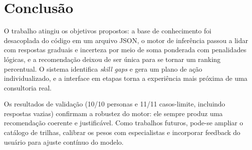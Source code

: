 \documentclass[12pt,a4paper]{article}
\begin{document}
\section{Conclus\~ao}

O trabalho atingiu os objetivos propostos: a base de conhecimento foi
desacoplada do c\'odigo em um arquivo JSON, o motor de infer\^encia passou a lidar
com respostas graduais e incerteza por meio de soma ponderada com penalidades
l\'ogicas, e a recomenda\c{c}\~ao deixou de ser \'unica para se tornar um ranking
percentual. O sistema identifica \textit{skill gaps} e gera um plano de a\c{c}\~ao
individualizado, e a interface em etapas torna a experi\^encia mais pr\'oxima de
uma consultoria real.

Os resultados de valida\c{c}\~ao (10/10 personas e 11/11 casos-limite, incluindo
respostas vazias) confirmam a robustez do motor: ele sempre produz uma
recomenda\c{c}\~ao coerente e justific\'avel. Como trabalhos futuros, pode-se
ampliar o cat\'alogo de trilhas, calibrar os pesos com especialistas e incorporar
feedback do usu\'ario para ajuste cont\'inuo do modelo.
\end{document}
